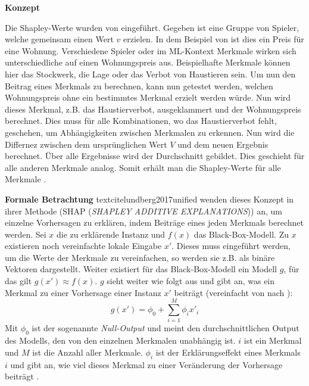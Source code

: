 \textbf{Konzept}

Die Shapley-Werte wurden von \textcite{shapley1951notes} eingeführt. Gegeben ist eine Gruppe von Spieler, welche gemeinsam einen Wert $v$ erzielen. In dem Beispiel von \textcite{molnar2022} ist dies ein Preis für eine Wohnung. Verschiedene Spieler oder im ML-Kontext Merkmale wirken sich unterschiedliche auf einen Wohnungspreis aus. Beispielhafte Merkmale können hier das Stockwerk, die Lage oder das Verbot von Haustieren sein. Um nun den Beitrag eines Merkmals zu berechnen, kann nun getestet werden, welchen Wohnungspreis ohne ein bestimmtes Merkmal erzielt werden würde. Nun wird dieses Merkmal, z.B. das Haustierverbot, ausgeklammert und der Wohnungspreis berechnet. Dies muss für alle Kombinationen, wo das Haustierverbot fehlt, geschehen, um Abhängigkeiten zwischen Merkmalen zu erkennen. Nun wird die Differnez zwischen dem ursprünglichen Wert $V$ und dem neuen Ergebnis berechnet. Über alle Ergebnisse wird der Durchschnitt gebildet. Dies geschieht für alle anderen Merkmale analog. Somit erhält man die Shapley-Werte für alle Merkmale \cite{molnar2022}.

\textbf{Formale Betrachtung}
textcite{lundberg2017unified} wenden dieses Konzept in ihrer Methode (SHAP (\emph{SHAPLEY ADDITIVE EXPLANATIONS})) an, um einzelne Vorhersagen zu erklären, indem Beiträge eines jeden Merkmals berechnet werden. Sei $x$ die zu erklärende Instanz und $f(x)$ das Black-Box-Modell. Zu $x$ existieren noch vereinfachte lokale Eingabe $x'$. Dieses muss eingeführt werden, um die Werte der Merkmale zu vereinfachen, so werden sie z.B. als binäre Vektoren dargestellt. Weiter existiert für das Black-Box-Modell ein Modell $g$, für das gilt $g(x') \approx f(x)$. $g$ sieht weiter wie folgt aus und gibt an, was ein Merkmal zu einer Vorhersage einer Instanz $x'$ beiträgt (vereinfacht von \cite{Gianfagna.2021} nach \cite{lundberg2017unified}):
\begin{equation}
    g(x') = \phi_{0} + \sum\limits_{i=1}^{M}\phi_{i}x'_{i}
\end{equation}
Mit $\phi_{0}$ ist der sogenannte \emph{Null-Output} und meint den durchschnittlichen Output des Modells, den von den einzelnen Merkmalen unabhängig ist. $i$ ist ein Merkmal und $M$ ist die Anzahl aller Merkmale. $\phi_{i}$ ist der Erklärungseffekt eines Merkmals $i$ und gibt an, wie viel dieses Merkmal zu einer Veränderung der Vorhersage beiträgt \cite{lundberg2017unified}. 


